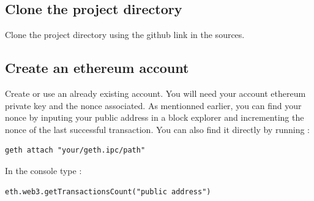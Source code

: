 \documentclass[11pt, a4paper, twoside, openright]{book} %
\begin{document}
\subsection*{Clone the project directory}
Clone the project directory using the github link in the sources.
\subsection*{Create an ethereum account}
Create or use an already existing account. You will need your account ethereum private key and the nonce associated. As mentionned earlier, you can find your nonce by inputing your public address in a block explorer and incrementing the nonce of the last successful transaction. You can also find it directly by running :
\begin{verbatim}
geth attach "your/geth.ipc/path"
\end{verbatim}
In the console type :
\begin{verbatim}
eth.web3.getTransactionsCount("public address")
\end{verbatim}
\end{document}
